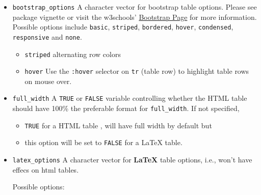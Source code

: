 \documentclass[
  a4paper,
  twoside,
  openright]{book}
\providecommand{\tightlist}{%
  \setlength{\itemsep}{0pt}\setlength{\parskip}{0pt}}
\theoremstyle{definition}
\theoremstyle{definition}
\theoremstyle{definition}
\theoremstyle{definition}
\theoremstyle{remark}
\begin{document}
\begin{itemize}
\item
  \texttt{bootstrap\_options} A character vector for bootstrap table options. Please see package vignette or visit the w3schools' \href{https://www.w3schools.com/bootstrap/bootstrap_tables.asp}{Bootstrap Page} for more information. Possible options include \texttt{basic}, \texttt{striped}, \texttt{bordered}, \texttt{hover}, \texttt{condensed}, \texttt{responsive} and \texttt{none}.

  \begin{itemize}
  \tightlist
  \item
    \texttt{striped} alternating row colors
  \item
    \texttt{hover} Use the \texttt{:hover} selector on \texttt{tr} (table row) to {highlight table rows} on mouse over.
  \end{itemize}
\item
  \texttt{full\_width} A \texttt{TRUE} or \texttt{FALSE} variable controlling whether the HTML table should have 100\% the preferable format for \texttt{full\_width}. If not specified,

  \begin{itemize}
  \tightlist
  \item
    \texttt{TRUE} for a HTML table , will have full width by default but
  \item
    this option will be set to \texttt{FALSE} for a LaTeX table.
  \end{itemize}
\item
  \texttt{latex\_options} A character vector for \textbf{LaTeX} table options, i.e., won't have effecs on html tables.

  Possible options:


\end{itemize}
\end{document}
